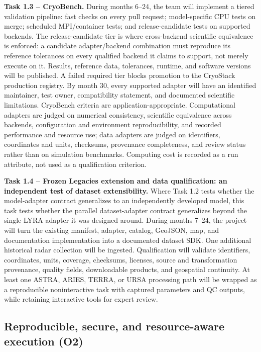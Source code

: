 \textbf{Task 1.3 -- CryoBench.} During months 6--24, the team will implement a
tiered validation pipeline: fast checks on every pull request; model-specific
CPU tests on merge; scheduled MPI/container tests; and release-candidate tests
on supported backends. The release-candidate tier is where cross-backend
scientific equivalence is enforced: a candidate adapter/backend combination
must reproduce its reference tolerances on every qualified backend it claims
to support, not merely execute on it. Results, reference data, tolerances,
runtime, and software versions will be published. A failed required tier
blocks promotion to the CryoStack production registry. By month 30, every
supported adapter will have an identified maintainer, test owner,
compatibility statement, and documented scientific limitations.
CryoBench criteria are application-appropriate. Computational adapters are
judged on numerical consistency, scientific equivalence across backends,
configuration and environment reproducibility, and recorded performance and
resource use; data adapters are judged on identifiers, coordinates and units,
checksums, provenance completeness, and review status rather than on
simulation benchmarks. Computing cost is recorded as a run attribute, not used
as a qualification criterion.

\textbf{Task 1.4 -- Frozen Legacies extension and data qualification: an
independent test of dataset extensibility.} Where Task 1.2 tests whether the
model-adapter contract generalizes to an independently developed model, this
task tests whether the parallel dataset-adapter contract generalizes beyond
the single LYRA adapter it was designed around. During
months 7--24, the project will turn the existing manifest, adapter, catalog,
GeoJSON, map, and documentation implementation into a documented dataset SDK.
One additional historical radar collection will be ingested. Qualification
will validate identifiers, coordinates, units, coverage, checksums, licenses,
source and transformation provenance, quality fields, downloadable products,
and geospatial continuity. At least one ASTRA, ARIES, TERRA, or URSA processing
path will be wrapped as a reproducible noninteractive task with captured
parameters and QC outputs, while retaining interactive tools for expert review.

\subsection{Reproducible, secure, and resource-aware execution (\textbf{O2})}

